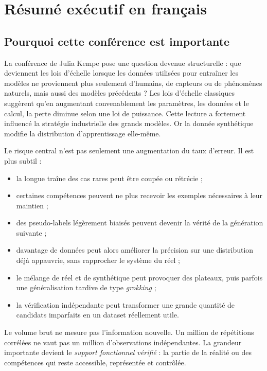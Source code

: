 \section{Résumé exécutif en français}

\subsection{Pourquoi cette conférence est importante}

La conférence de Julia Kempe pose une question devenue structurelle : que deviennent les lois d'échelle lorsque les données utilisées pour entraîner les modèles ne proviennent plus seulement d'humains, de capteurs ou de phénomènes naturels, mais aussi des modèles précédents ? Les lois d'échelle classiques suggèrent qu'en augmentant convenablement les paramètres, les données et le calcul, la perte diminue selon une loi de puissance. Cette lecture a fortement influencé la stratégie industrielle des grands modèles. Or la donnée synthétique modifie la distribution d'apprentissage elle-même.

Le risque central n'est pas seulement une augmentation du taux d'erreur. Il est plus subtil :

\begin{itemize}[leftmargin=*]
  \item la longue traîne des cas rares peut être coupée ou rétrécie ;
  \item certaines compétences peuvent ne plus recevoir les exemples nécessaires à leur maintien ;
  \item des pseudo-labels légèrement biaisés peuvent devenir la vérité de la génération suivante ;
  \item davantage de données peut alors améliorer la précision sur une distribution déjà appauvrie, sans rapprocher le système du réel ;
  \item le mélange de réel et de synthétique peut provoquer des plateaux, puis parfois une généralisation tardive de type \emph{grokking} ;
  \item la vérification indépendante peut transformer une grande quantité de candidats imparfaits en un dataset réellement utile.
\end{itemize}

\begin{keyidea}
Le volume brut ne mesure pas l'information nouvelle. Un million de répétitions corrélées ne vaut pas un million d'observations indépendantes. La grandeur importante devient le \emph{support fonctionnel vérifié} : la partie de la réalité ou des compétences qui reste accessible, représentée et contrôlée.
\end{keyidea}

